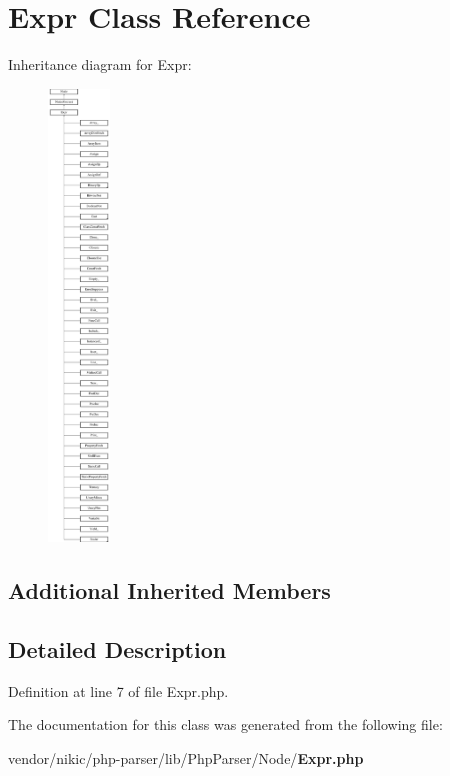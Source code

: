 \section{Expr Class Reference}
\label{class_php_parser_1_1_node_1_1_expr}
Inheritance diagram for Expr\+:\begin{figure}[H]
\begin{center}
\leavevmode
\includegraphics[height=12.000000cm]{class_php_parser_1_1_node_1_1_expr}
\end{center}
\end{figure}
\subsection*{Additional Inherited Members}


\subsection{Detailed Description}


Definition at line 7 of file Expr.\+php.



The documentation for this class was generated from the following file\+:\begin{DoxyCompactItemize}
\item 
vendor/nikic/php-\/parser/lib/\+Php\+Parser/\+Node/{\bf Expr.\+php}\end{DoxyCompactItemize}
